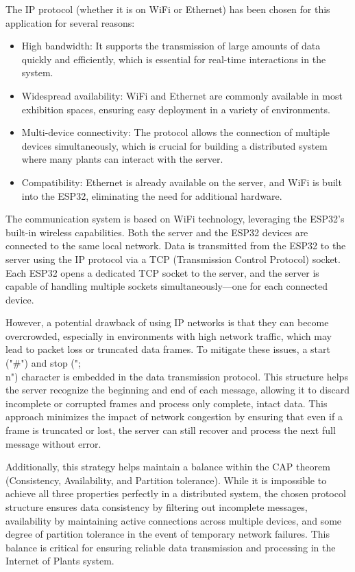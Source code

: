 The IP protocol (whether it is on WiFi or Ethernet) has been chosen for this application for several reasons:

\begin{itemize}
    \item High bandwidth: It supports the transmission of large amounts of data quickly and efficiently, which is essential for real-time interactions in the system.
    \item Widespread availability: WiFi and Ethernet are commonly available in most exhibition spaces, ensuring easy deployment in a variety of environments.
    \item Multi-device connectivity: The protocol allows the connection of multiple devices simultaneously, which is crucial for building a distributed system where many plants can interact with the server.
    \item Compatibility: Ethernet is already available on the server, and WiFi is built into the ESP32, eliminating the need for additional hardware.
\end{itemize}

The communication system is based on WiFi technology, leveraging the ESP32's built-in wireless capabilities. Both the server and the ESP32 devices are connected to the same local network. Data is transmitted from the ESP32 to the server using the IP protocol via a TCP (Transmission Control Protocol) socket. Each ESP32 opens a dedicated TCP socket to the server, and the server is capable of handling multiple sockets simultaneously—one for each connected device.

However, a potential drawback of using IP networks is that they can become overcrowded, especially in environments with high network traffic, which may lead to packet loss or truncated data frames. To mitigate these issues, a start ("#") and stop (";\\n") character is embedded in the data transmission protocol. This structure helps the server recognize the beginning and end of each message, allowing it to discard incomplete or corrupted frames and process only complete, intact data. This approach minimizes the impact of network congestion by ensuring that even if a frame is truncated or lost, the server can still recover and process the next full message without error.

Additionally, this strategy helps maintain a balance within the CAP theorem (Consistency, Availability, and Partition tolerance). While it is impossible to achieve all three properties perfectly in a distributed system, the chosen protocol structure ensures data consistency by filtering out incomplete messages, availability by maintaining active connections across multiple devices, and some degree of partition tolerance in the event of temporary network failures. This balance is critical for ensuring reliable data transmission and processing in the Internet of Plants system.



